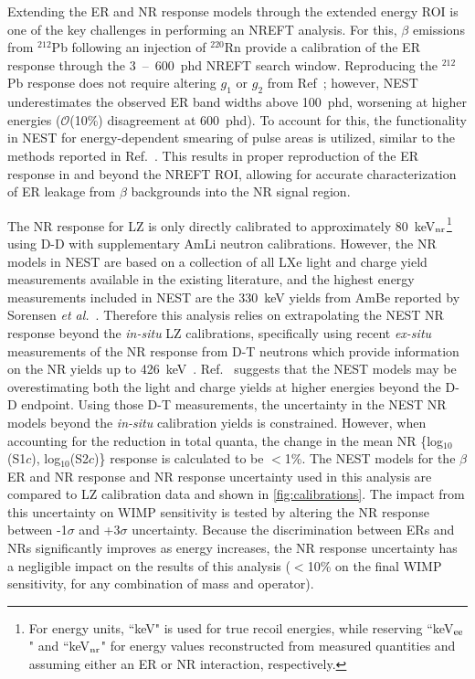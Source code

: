 \documentclass[reprint, showpacs,
preprintnumbers,
amsmath,amssymb,
aps, floatfix,
superscriptaddress,
prd, nofootinbib]{revtex4-1}
\begin{document}
Extending the ER and NR response models through the extended energy ROI is one of the key challenges in performing an NREFT analysis. For this, $\beta$ emissions from ${}^{212}$Pb following an injection of ${}^{220}$Rn provide a calibration of the ER response through the 3~--~600~phd NREFT search window. 
Reproducing the ${}^{212}$Pb response does not require altering $g_1$ or $g_2$ from Ref~\cite{LZ:SR1WS_2022}; however, NEST underestimates the observed ER band widths above 100~phd, worsening at higher energies ($\mathcal{O}$(10\%) disagreement at 600~phd). 
To account for this, the functionality in NEST for energy-dependent smearing of pulse areas is utilized, similar to the methods reported in Ref.~\cite{LUX:ER_modelling_2020}. 
This results in proper reproduction of the ER response in and beyond the NREFT ROI, allowing for accurate characterization of ER leakage from $\beta$ backgrounds into the NR signal region.
\par
The NR response for LZ is only directly calibrated to approximately 80~keV$_{\rm{nr}}$\footnote{For energy units, ``keV" is used for true recoil energies, while reserving ``keV$_{\rm{ee}}$" and ``keV$_{\rm{nr}}$" for energy values reconstructed from measured quantities and assuming either an ER or NR interaction, respectively.} using D-D with supplementary AmLi neutron calibrations. 
However, the NR models in NEST are based on a collection of all LXe light and charge yield measurements available in the existing literature, and the highest energy measurements included in NEST are the 330~keV yields from AmBe reported by Sorensen \textit{et al.}~\cite{Sorensen_2011}. 
Therefore this analysis relies on extrapolating the NEST NR response beyond the \textit{in-situ} LZ calibrations, specifically using recent \textit{ex-situ} measurements of the NR response from D-T neutrons which provide information on the NR yields up to 426~keV~\cite{DT_calib}. 
Ref.~\cite{DT_calib} suggests that the NEST models may be overestimating both the light and charge yields at higher energies beyond the D-D endpoint. 
Using those D-T measurements, the uncertainty in the NEST NR models beyond the \textit{in-situ} calibration yields is constrained. 
However, when accounting for the reduction in total quanta, the change in the mean NR \{log$_{10}$(S1$c$), log$_{10}$(S2$c$)\} response is calculated to be $<$1\%. 
The NEST models for the $\beta$ ER and NR response and NR response uncertainty used in this analysis are compared to LZ calibration data and shown in \autoref{fig:calibrations}.
The impact from this uncertainty on WIMP sensitivity is tested by altering the NR response between -1$\sigma$ and +3$\sigma$ uncertainty. 
Because the discrimination between ERs and NRs significantly improves as energy increases, the NR response uncertainty has a negligible impact on the results of this analysis ($<$10\% on the final WIMP sensitivity, for any combination of mass and operator). 
\end{document}
